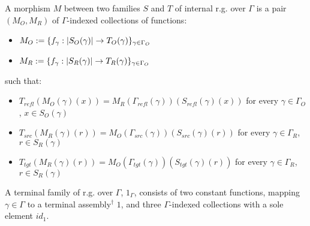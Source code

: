 \documentclass[12pt,a4paper]{article}
\def\cAsm{\mathcal{A}\mathit{sm}^\dagger}
\def\src{_{src}}\alwaysmath{src}
\def\rfl{_{refl}}\alwaysmath{rfl}
\def\tgt{_{tgt}}\alwaysmath{tgt}
\renewcommand{\O}{_{O}}
\newcommand{\R}{\ensuremath{_{R}}}
\begin{document}
A morphism $M$ between two families $S$ and $T$ of internal r.g. over $\Gamma$ is a pair $(M\O, M\R)$ of $\Gamma$-indexed collections of functions:
\begin{itemize}[noitemsep]
  \item $M\O \define \{f_\gamma : \carr{S\O(\gamma)} \to T\O(\gamma) \}_{\gamma \in \Gamma\O}$ 
  \item $M\R \define \{f_\gamma : \carr{S\R(\gamma)} \to T\R(\gamma) \}_{\gamma \in \Gamma\O}$
\end{itemize}
such that:
\begin{itemize}[noitemsep]
  \item $T\rfl(M\O (\gamma)(x)) = M\R(\Gamma\rfl(\gamma))(S\rfl(\gamma)(x))$ for every $\gamma \in \Gamma\O$, $x \in S\O(\gamma)$
  \item $T\src(M\R (\gamma)(r)) = M\O(\Gamma\src(\gamma))(S\src(\gamma)(r))$ for every $\gamma \in \Gamma\R$, $r \in S\R(\gamma)$
  \item $T\tgt(M\R (\gamma)(r)) = M\O(\Gamma\tgt(\gamma))(S\tgt(\gamma)(r))$ for every $\gamma \in \Gamma\R$, $r \in S\R(\gamma)$
  
\end{itemize}

A terminal family of r.g. over $\Gamma$, $1_\Gamma$,  consists of two constant functions, mapping $\gamma\in\Gamma$ to a terminal assembly$^\dagger$ $1$, and three $\Gamma$-indexed collections with a sole element $id_1$.

\end{document}
